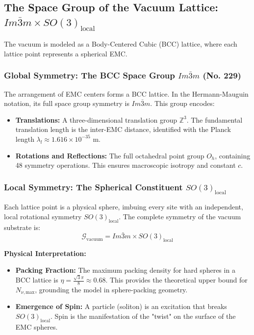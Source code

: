 \documentclass[10pt,a4paper]{article}
\begin{document}
\subsection{The Space Group of the Vacuum Lattice: $Im\bar{3}m \times SO(3)_{\text{local}}$}
The vacuum is modeled as a Body-Centered Cubic (BCC) lattice, where each lattice point represents a spherical EMC. 

\subsubsection{Global Symmetry: The BCC Space Group $Im\bar{3}m$ (No. 229)}
The arrangement of EMC centers forms a BCC lattice. In the Hermann-Mauguin notation, its full space group symmetry is $Im\bar{3}m$. This group encodes:
\begin{itemize}
	\item \textbf{Translations:} A three-dimensional translation group $\mathbb{Z}^3$. The fundamental translation length is the inter-EMC distance, identified with the Planck length $\lambda_l \approx 1.616 \times 10^{-35}$ m.
	\item \textbf{Rotations and Reflections:} The full octahedral point group $O_h$, containing 48 symmetry operations. This ensures macroscopic isotropy and constant $c$.
\end{itemize}

\subsubsection{Local Symmetry: The Spherical Constituent $SO(3)_{\text{local}}$}
Each lattice point is a physical sphere, imbuing every site with an independent, local rotational symmetry $SO(3)_{\text{local}}$. The complete symmetry of the vacuum substrate is:
\begin{equation}
	\mathcal{G}_{\text{vacuum}} = Im\bar{3}m \times SO(3)_{\text{local}}
\end{equation}

\textbf{Physical Interpretation:}
\begin{itemize}
	\item \textbf{Packing Fraction:} The maximum packing density for hard spheres in a BCC lattice is $\eta = \frac{\sqrt{3}\pi}{8} \approx 0.68$. This provides the theoretical upper bound for $N_{\nu,\text{max}}$, grounding the model in sphere-packing geometry.
	\item \textbf{Emergence of Spin:} A particle (soliton) is an excitation that breaks $SO(3)_{\text{local}}$. Spin is the manifestation of the "twist" on the surface of the EMC spheres.
\end{itemize}
\end{document}
